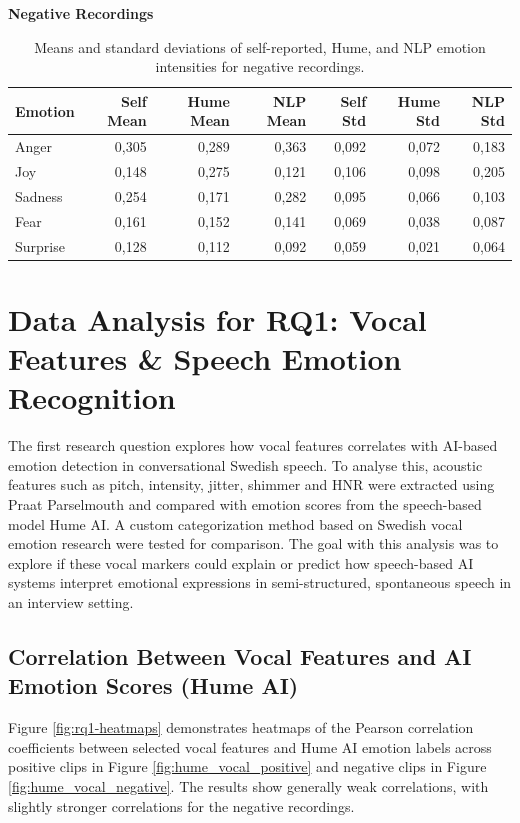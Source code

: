 \begin{table}[H]
    \centering
    \caption*{\textbf{Negative Recordings}}
    \begin{tabular}{lrrrrrr}
      \toprule
      \textbf{Emotion} & \textbf{Self Mean} & \textbf{Hume Mean} & \textbf{NLP Mean} & \textbf{Self Std} & \textbf{Hume Std} & \textbf{NLP Std} \\
      \midrule
      Anger    & 0,305 & 0,289 & 0,363 & 0,092 & 0,072 & 0,183 \\
      Joy      & 0,148 & 0,275 & 0,121 & 0,106 & 0,098 & 0,205 \\
      Sadness  & 0,254 & 0,171 & 0,282 & 0,095 & 0,066 & 0,103 \\
      Fear     & 0,161 & 0,152 & 0,141 & 0,069 & 0,038 & 0,087 \\
      Surprise & 0,128 & 0,112 & 0,092 & 0,059 & 0,021 & 0,064 \\
      \bottomrule
    \end{tabular}
    \caption{Means and standard deviations of self-reported, Hume, and NLP emotion intensities for negative recordings.}
    \label{tab:rq3_emotion-stats_neg}
  \end{table}


\section{Data Analysis for RQ1: Vocal Features \& Speech Emotion Recognition}
The first research question explores how vocal features correlates with AI-based emotion detection in conversational Swedish speech. 
To analyse this, acoustic features such as pitch, intensity, jitter, shimmer and HNR were extracted using Praat Parselmouth and compared with emotion 
scores from the speech-based model Hume AI. A custom categorization method based on Swedish vocal emotion research \autocite{Ekberg2023} were tested for comparison. 
The goal with this analysis was to explore if these vocal markers could explain or predict how speech-based AI systems interpret emotional expressions in 
semi-structured, spontaneous speech in an interview setting. 

\subsection{Correlation Between Vocal Features and AI Emotion Scores (Hume AI)}
Figure \ref{fig:rq1-heatmaps} demonstrates heatmaps of the Pearson correlation coefficients between selected vocal features and Hume AI emotion labels across positive clips in Figure \ref{fig:hume_vocal_positive} and negative clips in Figure \ref{fig:hume_vocal_negative}. The results show generally weak correlations, with slightly stronger correlations for the negative recordings.  

